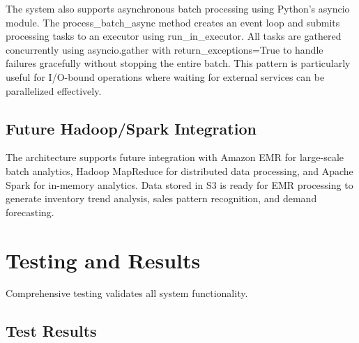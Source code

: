 \documentclass[conference]{IEEEtran}
\begin{document}
The system also supports asynchronous batch processing using Python's asyncio module. The process\_batch\_async method creates an event loop and submits processing tasks to an executor using run\_in\_executor. All tasks are gathered concurrently using asyncio.gather with return\_exceptions=True to handle failures gracefully without stopping the entire batch. This pattern is particularly useful for I/O-bound operations where waiting for external services can be parallelized effectively.

\subsection{Future Hadoop/Spark Integration}

The architecture supports future integration with Amazon EMR for large-scale batch analytics, Hadoop MapReduce for distributed data processing, and Apache Spark for in-memory analytics. Data stored in S3 is ready for EMR processing to generate inventory trend analysis, sales pattern recognition, and demand forecasting.

\section{Testing and Results}
\label{sec:testing}

Comprehensive testing validates all system functionality.

\subsection{Test Results}
\end{document}
